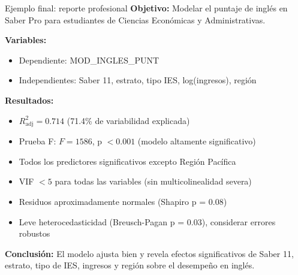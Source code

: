 \documentclass[aspectratio=169, 11pt]{beamer}
\begin{document}
\begin{frame}{Ejemplo final: reporte profesional}
\textbf{Objetivo:} Modelar el puntaje de inglés en Saber Pro para estudiantes de Ciencias Econ\'omicas y Administrativas.

\vspace{0.2cm}
\textbf{Variables:}
\begin{itemize}
  \item Dependiente: MOD\_INGLES\_PUNT
  \item Independientes: Saber 11, estrato, tipo IES, log(ingresos), región
\end{itemize}

\vspace{0.2cm}
\textbf{Resultados:}
\begin{itemize}
  \item $R^2_{\text{adj}} = 0.714$ (71.4\% de variabilidad explicada)
  \item Prueba F: $F = 1586$, p $< 0.001$ (modelo altamente significativo)
  \item Todos los predictores significativos excepto Región Pacífica
  \item VIF $< 5$ para todas las variables (sin multicolinealidad severa)
  \item Residuos aproximadamente normales (Shapiro p = 0.08)
  \item Leve heterocedasticidad (Breusch-Pagan p = 0.03), considerar errores robustos
\end{itemize}

\vspace{0.2cm}
\textbf{Conclusión:} El modelo ajusta bien y revela efectos significativos de Saber 11, estrato, tipo de IES, ingresos y región sobre el desempeño en inglés.
\end{frame}
\end{document}
